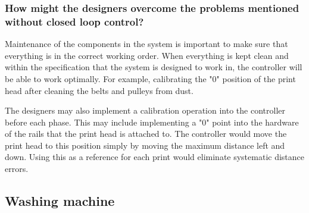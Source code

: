 \documentclass[class=report, crop=false, 12pt,a4paper]{standalone}
\begin{document}
\subsubsection*{How might the designers overcome the problems mentioned without closed loop control?}
Maintenance of the components in the system is important to make sure that everything is in the correct working order. When everything is kept clean and within the specification that the system is designed to work in, the controller will be able to work optimally. For example, calibrating the "0" position of the print head after cleaning the belts and pulleys from dust. 

The designers may also implement a calibration operation into the controller before each phase. This may include implementing a "0" point into the hardware of the rails that the print head is attached to. The controller would move the print head to this position simply by moving the maximum distance left and down. Using this as a reference for each print would eliminate systematic distance errors.
\subsection*{Washing machine}
\end{document}
